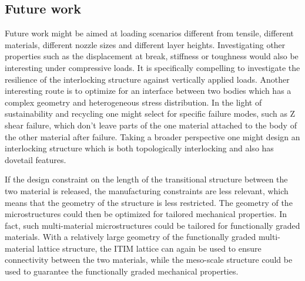 \subsection{Future work}
Future work might be aimed at loading scenarios different from tensile, different materials, different nozzle sizes and different layer heights.
Investigating other properties such as the displacement at break, stiffness or toughness would also be interesting under compressive loads.
It is specifically compelling to investigate the resilience of the interlocking structure against vertically applied loads.
Another interesting route is to optimize for an interface between two bodies which has a complex geometry and heterogeneous stress distribution.
In the light of sustainability and recycling one might select for specific failure modes, such as Z shear failure, which don't leave parts of the one material attached to the body of the other material after failure.
Taking a broader perspective one might design an interlocking structure which is both topologically interlocking and also has dovetail features.

If the design constraint on the length of the transitional structure between the two material is released,
the manufacturing constraints are less relevant, which means that the geometry of the structure is less restricted.
The geometry of the microstructures could then be optimized for tailored mechanical properties.
In fact, such multi-material microstructures could be tailored for functionally graded materials.
With a relatively large geometry of the functionally graded multi-material lattice structure,
the ITIM lattice can again be used to ensure connectivity between the two materials,
while the meso-scale structure could be used to guarantee the functionally graded mechanical properties.

